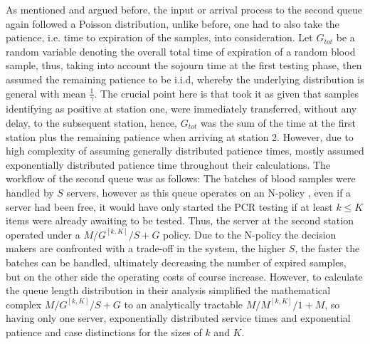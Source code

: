 \documentclass[11pt,a4paper]{article}
\begin{document}
\begin{spacing}{1.8}
As mentioned and argued before, the input or arrival process to the second queue again followed a Poisson distribution, unlike before, one had to also take the patience, i.e. time to expiration of the samples, into consideration. Let \(G_{tot}\) be a random variable denoting the overall total time of expiration of a random blood sample, thus, taking into account the sojourn time at the first testing phase, then \citep{BarLev2011} assumed the remaining patience to be i.i.d, whereby the underlying distribution is general with mean \(\frac{1}{\gamma}\). The crucial point here is that \citet{BarLev2011} took it as given that samples identifying as positive at station one, were immediately transferred, without any delay, to the subsequent station, hence, \(G_{tot}\) was the sum of the time at the first station plus the remaining patience when arriving at station 2. However, due to high complexity of assuming generally distributed patience times,  \citet{BarLev2011} mostly assumed exponentially distributed patience time throughout their calculations. The workflow of the second queue was as follows: The batches of blood samples were handled by \(S\) servers, however as this queue operates on an N-policy \citep{Hur1999}, even if a server had been free, it would have only started the PCR testing if at least \( k \leq K\) items were already awaiting to be tested. Thus, the server at the second station operated under a \(M/G^{[k,K]}/S+G\) policy. Due to the N-policy the decision makers are confronted with a trade-off in the system, the higher \(S\), the faster the batches can be handled, ultimately decreasing the number of expired samples, but on the other side the operating costs of course increase. However, to calculate the queue length distribution in their analysis \citet{BarLev2011} simplified the mathematical complex \(M/G^{[k,K]}/S+G\) to an analytically tractable \(M/M^{[k,K]}/1+M\), so having only one server, exponentially distributed service times and exponential patience and case distinctions for the sizes of \(k\) and \(K\).

\end{spacing}
\newpage


\end{document}
